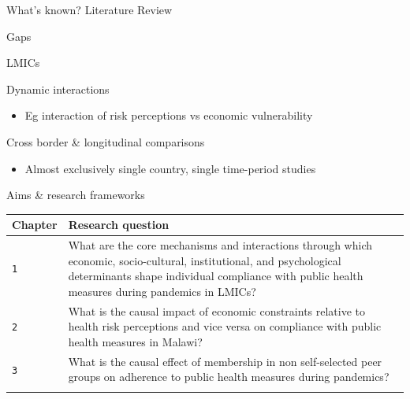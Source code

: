\documentclass[
  ignorenonframetext,
]{beamer}
\providecommand{\tightlist}{%
  \setlength{\itemsep}{0pt}\setlength{\parskip}{0pt}}\usepackage{longtable,booktabs,array}
\begin{document}
\begin{frame}[fragile]{What's known? Literature Review}
\begin{block}{Gaps}
\begin{block}{LMICs}
\begin{block}{Dynamic interactions}
\begin{itemize}
  \begin{itemize}
  \tightlist
  \item
    Eg interaction of risk perceptions vs economic vulnerability
  \end{itemize}
\end{itemize}
\end{block}

\begin{block}{Cross border \& longitudinal comparisons}
\label{cross-border-longitudinal-comparisons}
\begin{itemize}
\tightlist
\item
  Almost exclusively single country, single time-period studies
\end{itemize}
\end{block}
\end{block}
\end{block}

\begin{block}{Aims \& research frameworks}
\label{aims-research-frameworks}
\begin{longtable}[]{@{}
  >{\raggedright\arraybackslash}p{}
  >{\raggedright\arraybackslash}p{}@{}}
\toprule\noalign{}
\begin{minipage}[b]{\linewidth}\raggedright
Chapter
\end{minipage} & \begin{minipage}[b]{\linewidth}\raggedright
Research question
\end{minipage} \\
\midrule\noalign{}
\endhead
\texttt{1} & What are the core mechanisms and interactions through which
economic, socio-cultural, institutional, and psychological determinants
shape individual compliance with public health measures during pandemics
in LMICs? \\
\texttt{2} & What is the causal impact of economic constraints relative
to health risk perceptions and vice versa on compliance with public
health measures in Malawi? \\
\texttt{3} & What is the causal effect of membership in non
self-selected peer groups on adherence to public health measures during
pandemics? \\
\bottomrule\noalign{}
\end{longtable}

\end{block}
\end{frame}
\end{document}
